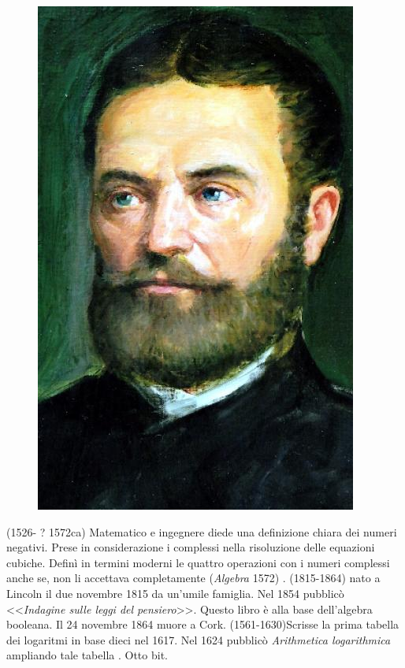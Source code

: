 \begin{figure}
	\centering
	\label{fig:bolyaijanosmarkosferencfestmenye}
	\includegraphics[width=0.7\linewidth]{Figure/B/Bolyai_Janos}
\end{figure}
(1526- ? 1572ca) Matematico e ingegnere diede una definizione chiara dei numeri negativi. Prese in considerazione i complessi nella risoluzione delle equazioni cubiche. Definì in termini moderni le quattro operazioni con i numeri complessi anche se, non li accettava completamente (\textit{Algebra} 1572) \cite{Kline1972}.
 (1815-1864)  nato a Lincoln il due novembre 1815 da un'umile famiglia. Nel 1854 pubblicò <<\textit{Indagine sulle leggi del pensiero}>>. Questo libro è alla base dell'algebra booleana. Il 24 novembre 1864 muore a Cork.\cite{Nahin2015} 
(1561-1630)Scrisse la prima tabella dei logaritmi in base dieci \cite{Kline1972} nel 1617. Nel 1624  pubblicò \textit{Arithmetica logarithmica} ampliando tale tabella \cite{Boyer1980}.
 Otto bit.